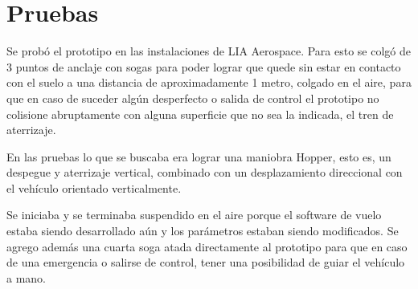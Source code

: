 \section{Pruebas}\label{sec:tests}

Se probó el prototipo en las instalaciones de LIA Aerospace. Para esto se colgó de 3 puntos de anclaje con sogas para poder lograr que quede sin estar en contacto con el suelo a una distancia de aproximadamente 1 metro, colgado en el aire, para que en caso de suceder algún desperfecto o salida de control el prototipo no colisione abruptamente con alguna superficie que no sea la indicada, el tren de aterrizaje.

\medskip

En las pruebas lo que se buscaba era lograr una maniobra Hopper, esto es, un despegue y aterrizaje vertical, combinado con un desplazamiento direccional con el vehículo orientado verticalmente.

\medskip

Se iniciaba y se terminaba suspendido en el aire porque el software de vuelo estaba siendo desarrollado aún y los parámetros estaban siendo modificados.
Se agrego además una cuarta soga atada directamente al prototipo para que en caso de una emergencia o salirse de control, tener una posibilidad de guiar el vehículo a mano.
